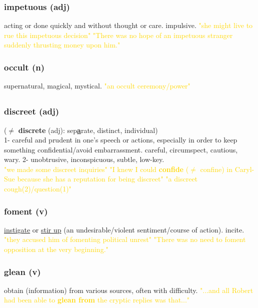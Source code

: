 \documentclass{proc}
\begin{document}
	\subsubsection{\textcolor{brickred}{impetuous} (adj)}
	acting or done quickly and without thought or care. impulsive.
	\textcolor{gold}{"she might live to rue this impetuous decision" "There was no hope of an impetuous stranger suddenly thrusting money upon him."}
	
	\subsubsection{\textcolor{brickred}{occult} (n)}
	supernatural,
	magical,
	mystical.
	\textcolor{gold}{"an occult ceremony/power"}
	
	\newpage
	\subsection{}
	\subsubsection{\textcolor{brickred}{discreet} (adj)}
	($\ne$ \textbf{discrete} (adj): sep\textbf{\underline{a}}rate, distinct, individual)\\
	1- careful and prudent in one's speech or actions, especially in order to keep something confidential/avoid embarrassment. careful,
	circumspect,
	cautious,
	wary.
	2- unobtrusive,
	inconspicuous,
	subtle,
	low-key.\\
	\textcolor{gold}{"we made some discreet inquiries" "I knew I could \textbf{confide} ($\ne$ confine) in Caryl-Sue because she has a reputation for being discreet" "a discreet cough(2)/question(1)"}
	
	\subsubsection{\textcolor{brickred}{foment} (v)}
	\underline{instigate} or \underline{stir up} (an undesirable/violent sentiment/course of action). incite.
	\textcolor{gold}{"they accused him of fomenting political unrest" "There was no need to foment opposition at the very beginning."}
	
	\subsubsection{\textcolor{brickred}{glean} (v)}
	obtain (information) from various sources, often with difficulty.
	\textcolor{gold}{ "...and  all Robert had been able to \textbf{glean from} the cryptic replies was that..."}
	
\end{document}
